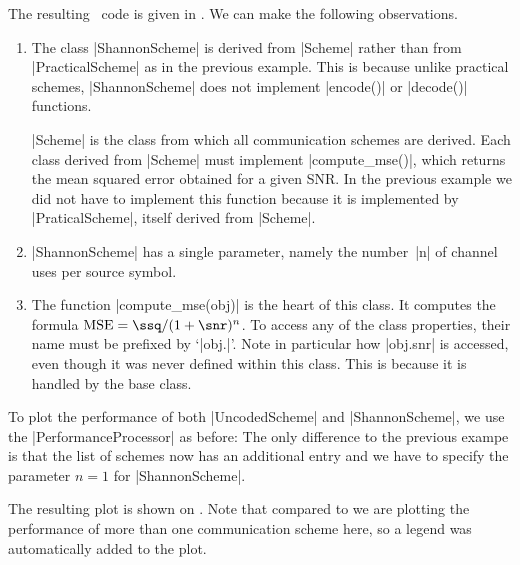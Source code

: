 The resulting \matlab\ code is given in . We can make the
following observations.
\begin{enumerate}
  \item The class |ShannonScheme| is derived from |Scheme| rather than from
    |PracticalScheme| as in the previous example. This is because unlike
    practical schemes, |ShannonScheme| does not implement |encode()| or
    |decode()| functions. 
    
    |Scheme| is the class from which all communication schemes are derived. Each
    class derived from |Scheme| must implement |compute_mse()|, which returns
    the mean squared error obtained for a given SNR. In the previous example we
    did not have to implement this function because it is implemented by
    |PraticalScheme|, itself derived from |Scheme|.
    
  \item |ShannonScheme| has a single parameter, namely the number~|n| of channel
    uses per source symbol.

  \item The function |compute_mse(obj)| is the heart of this class. It computes
    the formula $\text{MSE} = \ssq / (1 + \snr)^n$. To access any of the class
    properties, their name must be prefixed by `|obj.|'.  Note in particular how
    |obj.snr| is accessed, even though it was never defined within this class.
    This is because it is handled by the base class. 
\end{enumerate}

To plot the performance of both |UncodedScheme| and |ShannonScheme|, we use
the |PerformanceProcessor| as before:
The only difference to the previous exampe is that the list of schemes now has
an additional entry and we have to specify the parameter $n=1$ for
|ShannonScheme|.

The resulting plot is shown on . Note that compared to
 we are plotting the performance of more than one communication
scheme here, so a legend was automatically added to the plot.

